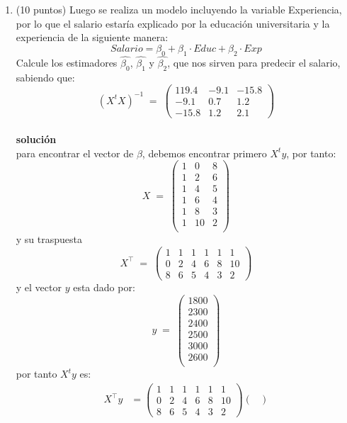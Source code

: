 \documentclass[10pt,a4paper]{article}
\begin{document}
\begin{enumerate}
\begin{enumerate}
    \item (10 puntos) Luego se realiza un modelo incluyendo la variable Experiencia, por lo que el salario estaría explicado por la educación universitaria y la experiencia de la siguiente manera:
    $$Salario = \beta_0 + \beta_1 \cdot Educ + \beta_2 \cdot Exp$$
    Calcule los estimadores $\hat{\beta_0}$, $\hat{\beta_1}$ y $\hat{\beta_2}$, que nos sirven para predecir el salario, sabiendo que:
    \[
(X^tX)^{-1} \;=\;
\begin{pmatrix}
119.4 & -9.1 & -15.8 \\
-9.1 & 0.7 & 1.2 \\
-15.8 & 1.2 & 2.1
\end{pmatrix}
\]
    \\
    \textbf{solución}
    \\
 para encontrar el vector de $\beta$, debemos encontrar primero $X^ty$, por tanto:
     \[
X \;=\;
\begin{pmatrix}
1  & 0 & 8 \\
1  & 2 & 6 \\
1  & 4 & 5 \\
1  & 6 & 4\\
1  & 8 & 3 \\
1  & 10 & 2 \\
\end{pmatrix}
\]
y su traspuesta
\[
X^{\top} \;=\;
\begin{pmatrix}
1 & 1 & 1 & 1 & 1 & 1 \\
0 & 2 & 4 & 6 & 8 & 10 \\
8 & 6 & 5 & 4 & 3 & 2
\end{pmatrix}
\]
y el vector $y$ esta dado por:
  \[
y \;=\;
   \begin{pmatrix}
      1800 \\
2300 \\
2400 \\
2500 \\
3000 \\
 2600\\
   \end{pmatrix} 
\]
por tanto $X^ty$ es:
\[
\begin{aligned}
X^{\top}y 
   &= 
\begin{pmatrix}
1 & 1 & 1 & 1 & 1 & 1 \\
0 & 2 & 4 & 6 & 8 & 10 \\
8 & 6 & 5 & 4 & 3 & 2
\end{pmatrix}
   \begin{pmatrix}

\end{pmatrix}
\end{aligned}\]
\end{enumerate}
\end{enumerate}
\end{document}
